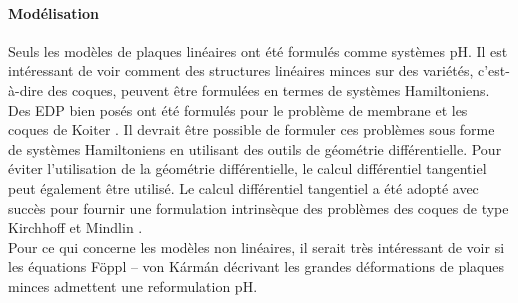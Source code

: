 \paragraph{Modélisation}
Seuls les modèles de plaques linéaires ont été formulés comme systèmes pH. Il est intéressant de voir comment des structures linéaires minces sur des variétés, c'est-à-dire des coques, peuvent être formulées en termes de systèmes Hamiltoniens. Des EDP bien posés ont été formulés pour le problème de membrane et les coques de Koiter \cite{ciarlet2000shells}. Il devrait être possible de formuler ces problèmes sous forme de systèmes Hamiltoniens en utilisant des outils de géométrie différentielle. Pour éviter l'utilisation de la géométrie différentielle, le calcul différentiel tangentiel \cite{delfour2011shapes} peut également être utilisé. Le calcul différentiel tangentiel a été adopté avec succès pour fournir une formulation intrinsèque des problèmes des coques de type Kirchhoff \cite{schollhammer2019kirchhoff} et Mindlin \cite{schollhammer2019reissner}. \\
Pour ce qui concerne les modèles non linéaires, il serait très intéressant de voir si les équations F\"oppl – von K\'arm\'an décrivant les grandes déformations de plaques minces \cite{bilbao2015conservative} admettent une reformulation pH. \\

